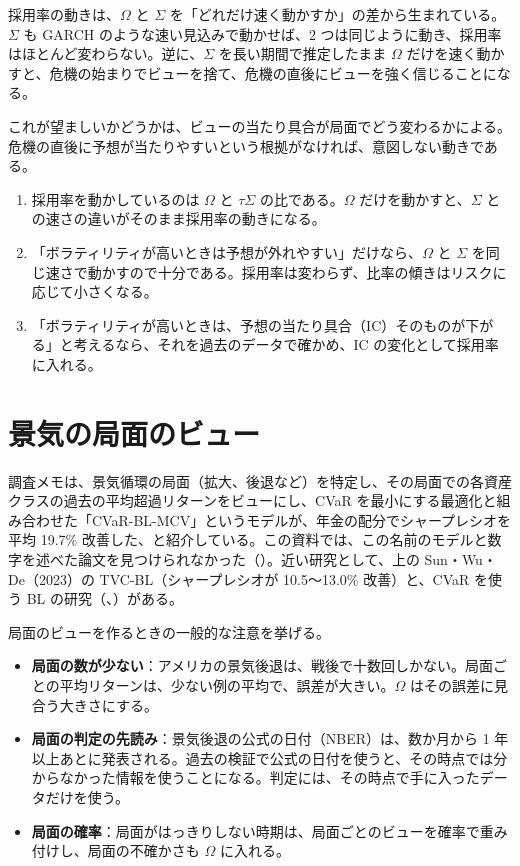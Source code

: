 採用率の動きは、$\Omega$ と $\Sigma$ を「どれだけ速く動かすか」の差から生まれている。$\Sigma$ も GARCH のような速い見込みで動かせば、2 つは同じように動き、採用率はほとんど変わらない。逆に、$\Sigma$ を長い期間で推定したまま $\Omega$ だけを速く動かすと、危機の始まりでビューを捨て、危機の直後にビューを強く信じることになる。

これが望ましいかどうかは、ビューの当たり具合が局面でどう変わるかによる。危機の直後に予想が当たりやすいという根拠がなければ、意図しない動きである。

\begin{tipbox}
\begin{enumerate}
\item 採用率を動かしているのは $\Omega$ と $\tau\Sigma$ の比である。$\Omega$ だけを動かすと、$\Sigma$ との速さの違いがそのまま採用率の動きになる。
\item 「ボラティリティが高いときは予想が外れやすい」だけなら、$\Omega$ と $\Sigma$ を同じ速さで動かすので十分である。採用率は変わらず、比率の傾きはリスクに応じて小さくなる。
\item 「ボラティリティが高いときは、予想の当たり具合（IC）そのものが下がる」と考えるなら、それを過去のデータで確かめ、IC の変化として採用率に入れる。
\end{enumerate}
\end{tipbox}

\section{景気の局面のビュー}

調査メモは、景気循環の局面（拡大、後退など）を特定し、その局面での各資産クラスの過去の平均超過リターンをビューにし、CVaR を最小にする最適化と組み合わせた「CVaR-BL-MCV」というモデルが、年金の配分でシャープレシオを平均 19.7\% 改善した、と紹介している。この資料では、この名前のモデルと数字を述べた論文を見つけられなかった（）。近い研究として、上の Sun・Wu・De（2023）の TVC-BL（シャープレシオが 10.5〜13.0\% 改善）と、CVaR を使う BL の研究（、）がある。

局面のビューを作るときの一般的な注意を挙げる。

\begin{itemize}
\item \textbf{局面の数が少ない}：アメリカの景気後退は、戦後で十数回しかない。局面ごとの平均リターンは、少ない例の平均で、誤差が大きい。$\Omega$ はその誤差に見合う大きさにする。
\item \textbf{局面の判定の先読み}：景気後退の公式の日付（NBER）は、数か月から 1 年以上あとに発表される。過去の検証で公式の日付を使うと、その時点では分からなかった情報を使うことになる。判定には、その時点で手に入ったデータだけを使う。
\item \textbf{局面の確率}：局面がはっきりしない時期は、局面ごとのビューを確率で重み付けし、局面の不確かさも $\Omega$ に入れる。
\end{itemize}

